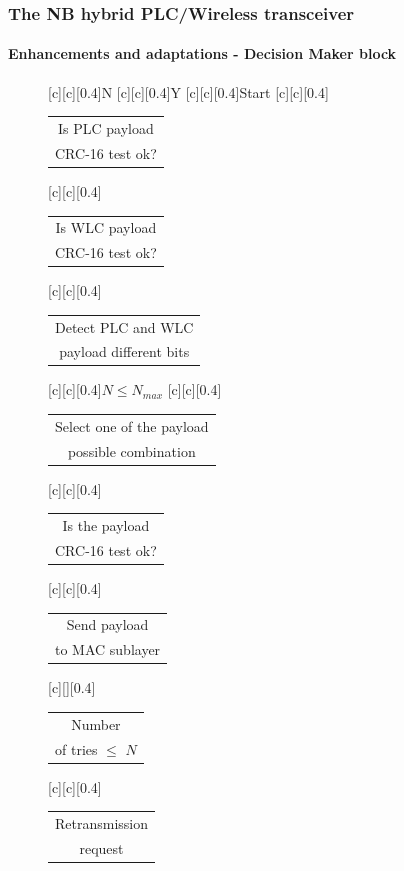 \documentclass[mathserif]{beamer}
\begin{document}
\begin{frame}
	\frametitle{The NB hybrid PLC/Wireless transceiver}
	\framesubtitle{Enhancements and adaptations - Decision Maker block}
	\renewcommand{\sizeLetter}{0.4}
	\begin{figure}[ht]
		[\sizeLetter]{N}
		[\sizeLetter]{Y}
		[\sizeLetter]{Start}
		[\sizeLetter]{\begin{tabular}{@{}c@{}}
				Is PLC payload\\ 
				CRC-16 test ok?\\ 
		\end{tabular} }
		[\sizeLetter]{\begin{tabular}{@{}c@{}}
				Is WLC payload\\ 
				CRC-16 test ok?\\ 
		\end{tabular} }
		[\sizeLetter]{\begin{tabular}{@{}c@{}}
				Detect PLC and WLC\\ 
				payload different bits\\ 
		\end{tabular} }
		[\sizeLetter]{$N \leqslant N_{max}$}
		[\sizeLetter]{\begin{tabular}{@{}c@{}}
				Select one of the payload\\ 
				possible combination\\ 
		\end{tabular} }	
		[\sizeLetter]{\begin{tabular}{@{}c@{}}
				Is the payload\\ 
				CRC-16 test ok?\\ 
		\end{tabular} }
		[\sizeLetter]{\begin{tabular}{@{}c@{}}
				Send payload\\ 
				to MAC sublayer\\ 
		\end{tabular} }
		[c][][\sizeLetter]{\begin{tabular}{@{}c@{}}
				Number\\ 
				of tries $\leqslant$ $N$
		\end{tabular} }
		[\sizeLetter]{\begin{tabular}{@{}c@{}}
				Retransmission\\ 
				request\\ 
		\end{tabular} }

\end{figure}
\end{frame}
\end{document}
